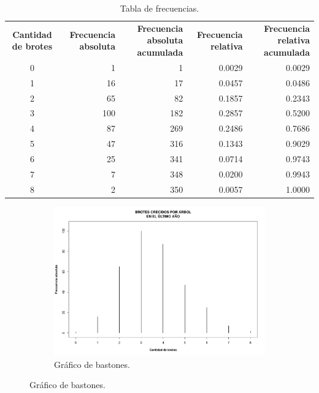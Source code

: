 \documentclass[11pt]{article}
\begin{document}
\begin{table}[h!]
  \begin{center}
    \begin{tabular}{| c | r | r | r | r |}
      \hline
      \multirow{3}{3cm}{\centering\textbf{Cantidad de brotes}} & 
      \multirow{3}{2.5cm}{\centering\textbf{Frecuencia absoluta}} & 
      \multirow{3}{2.5cm}{\centering\textbf{Frecuencia absoluta acumulada}} &
      \multirow{3}{2.5cm}{\centering\textbf{Frecuencia relativa}} & 
      \multirow{3}{2.5cm}{\centering\textbf{Frecuencia relativa acumulada}} \\
      & & & & \\
      & & & & \\ \hline
      0	& 1	& 1 & 0.0029	& 0.0029 \\ \hline
      1	& 16	& 17	& 0.0457	& 0.0486 \\ \hline
      2	& 65	& 82	& 0.1857	& 0.2343 \\ \hline
      3	& 100	& 182	& 0.2857	& 0.5200 \\ \hline
      4	& 87	& 269	& 0.2486	& 0.7686 \\ \hline
      5	& 47	& 316	& 0.1343	& 0.9029 \\ \hline
      6	& 25	& 341	& 0.0714	& 0.9743 \\ \hline
      7	& 7	& 348	& 0.0200	& 0.9943 \\ \hline
      8	& 2	& 350	& 0.0057	& 1.0000 \\ \hline
    \end{tabular}
    \caption{Tabla de frecuencias.}
    \label{tab:tablaBrotes}
  \end{center}
\end{table}

\begin{figure}[h!]
  \begin{center}
    \begin{subfigure}[b]{0.9\linewidth}
      \includegraphics[width=\linewidth]{bastonesBrotes.pdf}
      \caption{Gráfico de bastones.}
      \label{fig:bastonesBrotes}
    \end{subfigure}
  \end{center}
\end{figure}
\end{document}
